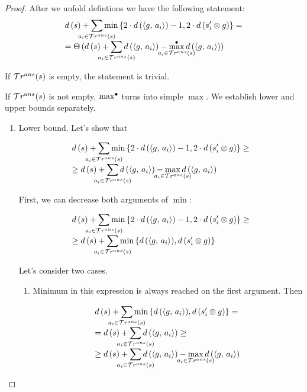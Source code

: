\begin{proof}
After we unfold defintions we have the following statement:
\[ \begin{array}{l}
d\,(s) + \smashoperator[lr]{\sum\limits_{a_i \in \tra{s}}} \min\,\{2\cdot d\,(\taskst{g}{a_i}) - 1, 2\cdot d\,(s'_i \otimes g)\}  = \\
= \Theta\,(d\,(s) + \smashoperator[lr]{\sum\limits_{a_i \in \tra{s}}} d\,(\taskst{g}{a_i}) - \smashoperator{\maxd\limits_{a_i \in \tra{s}}} d\,(\taskst{g}{a_i})) \\
\end{array} \]

If $\mathcal{T}r^{ans}(s)$ is empty, the statement is trivial.

If $\mathcal{T}r^{ans}(s)$ is not empty, $\max^{\bullet}$ turns into simple $\max$. We establish lower and upper bounds separately.

\begin{enumerate}
  \item
  Lower bound. Let's show that 
  
  \[ \begin{array}{l}
  d\,(s) + \smashoperator[lr]{\sum\limits_{a_i \in \tra{s}}} \min\,\{2\cdot d\,(\taskst{g}{a_i}) - 1, 2\cdot d\,(s'_i \otimes g)\}  \ge \\
  \ge d\,(s) + \smashoperator[lr]{\sum\limits_{a_i \in \tra{s}}} d\,(\taskst{g}{a_i}) - \smashoperator{\max\limits_{a_i \in \tra{s}}} d\,(\taskst{g}{a_i}) \\
  \end{array} \]

  First, we can decrease both arguments of $\min$:

  \[ \begin{array}{l}
  d\,(s) + \smashoperator[lr]{\sum\limits_{a_i \in \tra{s}}} \min\,\{2\cdot d\,(\taskst{g}{a_i}) - 1, 2\cdot d\,(s'_i \otimes g)\}  \ge \\
  \ge d\,(s) + \smashoperator[lr]{\sum\limits_{a_i \in \tra{s}}} \min\,\{ d\,(\taskst{g}{a_i}), d\,(s'_i \otimes g)\} \\
  \end{array} \]

  Let's consider two cases.

  \begin{enumerate}
    \item Minimum in this expression is always reached on the first argument. Then
    
    \[ \begin{array}{l}
        d\,(s) + \smashoperator[lr]{\sum\limits_{a_i \in \tra{s}}} \min\,\{ d\,(\taskst{g}{a_i}), d\,(s'_i \otimes g)\} = \\
        = d\,(s) + \smashoperator[lr]{\sum\limits_{a_i \in \tra{s}}} d\,(\taskst{g}{a_i}) \ge \\
        \ge d\,(s) + \smashoperator[lr]{\sum\limits_{a_i \in \tra{s}}} d\,(\taskst{g}{a_i}) - \smashoperator{\max\limits_{a_i \in \tra{s}}} d\,(\taskst{g}{a_i}) \\
  \end{array} \]
  

\end{enumerate}
\end{enumerate}
\end{proof}
